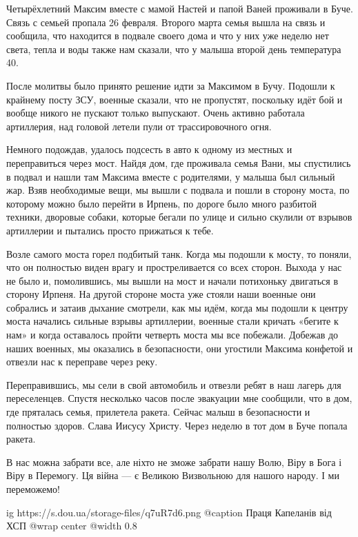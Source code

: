 \begin{zzquote}
Четырёхлетний Максим вместе с мамой Настей и папой Ваней проживали в Буче.
Связь с семьей пропала 26 февраля. Второго марта семья вышла на связь и
сообщила, что находится в подвале своего дома и что у них уже неделю нет света,
тепла и воды также нам сказали, что у малыша второй день температура 40.

После молитвы было принято решение идти за Максимом в Бучу. Подошли к крайнему
посту ЗСУ, военные сказали, что не пропустят, поскольку идёт бой и вообще
никого не пускают только выпускают. Очень активно работала артиллерия, над
головой летели пули от трассировочного огня.

Немного подождав, удалось подсесть в авто к одному из местных и переправиться
через мост. Найдя дом, где проживала семья Вани, мы спустились в подвал и нашли
там Максима вместе с родителями, у малыша был сильный жар. Взяв необходимые
вещи, мы вышли с подвала и пошли в сторону моста, по которому можно было
перейти в Ирпень, по дороге было много разбитой техники, дворовые собаки,
которые бегали по улице и сильно скулили от взрывов артиллерии и пытались
просто прижаться к тебе.

Возле самого моста горел подбитый танк. Когда мы подошли к мосту, то поняли,
что он полностью виден врагу и простреливается со всех сторон. Выхода у нас не
было и, помолившись, мы вышли на мост и начали потихоньку двигаться в сторону
Ирпеня. На другой стороне моста уже стояли наши военные они собрались и затаив
дыхание смотрели, как мы идём, когда мы подошли к центру моста начались сильные
взрывы артиллерии, военные стали кричать «бегите к нам» и когда оставалось
пройти четверть моста мы все побежали. Добежав до наших военных, мы оказались в
безопасности, они угостили Максима конфетой и отвезли нас к переправе через
реку.

Переправившись, мы сели в свой автомобиль и отвезли ребят в наш лагерь для
переселенцев. Спустя несколько часов после эвакуации мне сообщили, что в дом,
где пряталась семья, прилетела ракета. Сейчас малыш в безопасности и полностью
здоров. Слава Иисусу Христу. Через неделю в тот дом в Буче попала ракета.
\end{zzquote}

В нас можна забрати все, але ніхто не зможе забрати нашу Волю, Віру в Бога і
Віру в Перемогу. Ця війна — є Великою Визвольною для нашого народу. І ми
переможемо!

\ifcmt
  ig https://s.dou.ua/storage-files/q7uR7d6.png
	@caption Праця Капеланів від ХСП
  @wrap center
  @width 0.8
\fi

